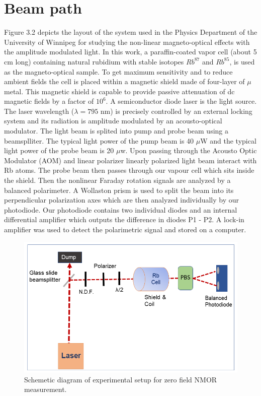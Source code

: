 \documentclass[12pt]{report}
\begin{document}
\section{Beam path}
 Figure 3.2 depicts the layout of the system used in the Physics Department of the University of Winnipeg for studying the non-linear magneto-optical effects with the amplitude modulated light. In this work, a paraffin-coated vapor cell (about 5 cm long) containing natural rubidium with stable isotopes $Rb^{87}$ and $Rb^{85}$, is used as the magneto-optical sample. To get maximum sensitivity and to reduce ambient fields the cell is placed within a magnetic shield made of four-layer of $\mu$ metal. This magnetic shield is capable to provide passive attenuation of dc magnetic fields by a factor of $10^6$. A semiconductor diode laser is the light source. The laser wavelength ($\lambda=795$ nm) is precisely controlled by an external locking system and its radiation is amplitude modulated by an acousto-optical modulator.  The light beam is splited into pump and probe beam using a beamsplliter. The typical light power of the pump beam is 40 $\mu$W and the typical light power of the probe beam is 20  $\mu$w. Upon passing through the Acousto Optic Modulator (AOM) and linear polarizer  linearly polarized light beam interact with Rb atoms. The probe beam then passes through our vapour cell which sits inside the shield. Then the nonlinear Faraday rotation signals are analyzed by a balanced polarimeter.  A Wollaston prism is used to split the beam into its perpendicular polarization axes which are then analyzed individually by our photodiode. Our photodiode contains two individual diodes and an internal differential amplifier which outputs the difference in diodes P1 - P2. A lock-in amplifier was used to detect the polarimetric signal and stored on a computer.
\begin{figure}[h]
\centering
\includegraphics[width=1.1\linewidth]{figures/experimental_setup_zero_field}
\caption{Schemetic diagram of experimental setup  for zero field NMOR measurement.}
\end{figure}
\end{document}
